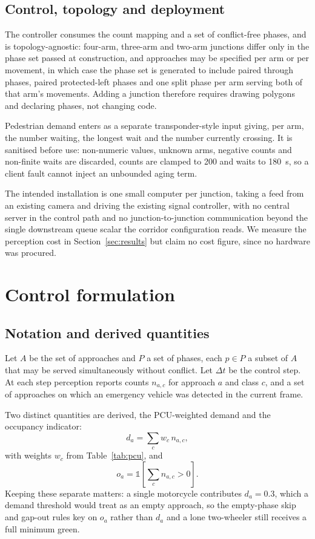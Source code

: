 \documentclass[journal]{IEEEtran}
\newcommand{\pcu}{PCU}
\begin{document}
\subsection{Control, topology and deployment}

The controller consumes the count mapping and a set of conflict-free phases, and is topology-agnostic:
four-arm, three-arm and two-arm junctions differ only in the phase set passed at construction, and
approaches may be specified per arm or per movement, in which case the phase set is generated to
include paired through phases, paired protected-left phases and one split phase per arm serving both of
that arm's movements. Adding a junction therefore requires drawing polygons and declaring phases, not
changing code.

Pedestrian demand enters as a separate transponder-style input giving, per arm, the number waiting, the
longest wait and the number currently crossing. It is sanitised before use: non-numeric values, unknown
arms, negative counts and non-finite waits are discarded, counts are clamped to 200 and waits to
180~s, so a client fault cannot inject an unbounded aging term.

The intended installation is one small computer per junction, taking a feed from an existing camera and
driving the existing signal controller, with no central server in the control path and no
junction-to-junction communication beyond the single downstream queue scalar the corridor configuration
reads. We measure the perception cost in Section~\ref{sec:results} but claim no cost figure, since no
hardware was procured.

\section{Control formulation}
\label{sec:control}

\subsection{Notation and derived quantities}

Let $A$ be the set of approaches and $P$ a set of phases, each $p \in P$ a subset of $A$ that may be
served simultaneously without conflict. Let $\Delta t$ be the control step. At each step perception
reports counts $n_{a,c}$ for approach $a$ and class $c$, and a set of approaches on which an
emergency vehicle was detected in the current frame.

Two distinct quantities are derived, the \pcu-weighted demand and the occupancy indicator:
\begin{equation}
d_a = \sum_{c} w_c \, n_{a,c},
\label{eq:demand}
\end{equation}
with weights $w_c$ from Table~\ref{tab:pcu}, and
\begin{equation}
o_a = \mathbb{1}\!\left[\textstyle\sum_c n_{a,c} > 0\right].
\label{eq:presence}
\end{equation}
Keeping these separate matters: a single motorcycle contributes $d_a = 0.3$, which a demand threshold
would treat as an empty approach, so the empty-phase skip and gap-out rules key on $o_a$ rather than
$d_a$ and a lone two-wheeler still receives a full minimum green.
\end{document}
